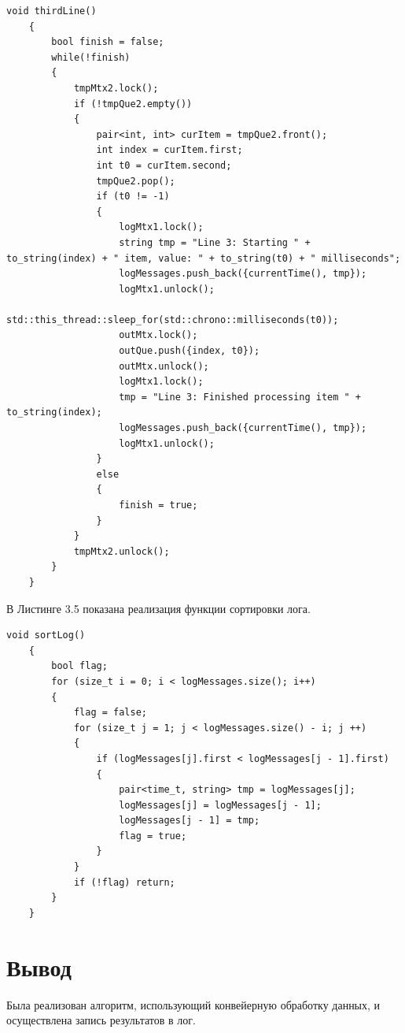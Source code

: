 \documentclass[a4paper,12pt]{report}
\begin{document}
\begin{lstlisting}[caption=Функция третьей линии конвеера]
    void thirdLine()
    {
        bool finish = false;
        while(!finish)
        {
            tmpMtx2.lock();
            if (!tmpQue2.empty())
            {
                pair<int, int> curItem = tmpQue2.front();
                int index = curItem.first;
                int t0 = curItem.second;
                tmpQue2.pop();
                if (t0 != -1)
                {
                    logMtx1.lock();
                    string tmp = "Line 3: Starting " + to_string(index) + " item, value: " + to_string(t0) + " milliseconds";
                    logMessages.push_back({currentTime(), tmp});
                    logMtx1.unlock();
                    std::this_thread::sleep_for(std::chrono::milliseconds(t0));
                    outMtx.lock();
                    outQue.push({index, t0});
                    outMtx.unlock();
                    logMtx1.lock();
                    tmp = "Line 3: Finished processing item " + to_string(index);
                    logMessages.push_back({currentTime(), tmp});
                    logMtx1.unlock();
                }
                else
                {
                    finish = true;
                }
            }
            tmpMtx2.unlock();
        }
    }
\end{lstlisting}

В Листинге 3.5 показана реализация функции сортировки лога.

\begin{lstlisting}[caption=Функция сортировки лога]
    void sortLog()
    {
        bool flag;
        for (size_t i = 0; i < logMessages.size(); i++)
        {
            flag = false;
            for (size_t j = 1; j < logMessages.size() - i; j ++)
            {
                if (logMessages[j].first < logMessages[j - 1].first)
                {
                    pair<time_t, string> tmp = logMessages[j];
                    logMessages[j] = logMessages[j - 1];
                    logMessages[j - 1] = tmp;
                    flag = true;
                }
            }
            if (!flag) return;
        }
    }
\end{lstlisting}

\section{Вывод}
Была реализован алгоритм, использующий конвейерную обработку данных, и осуществлена запись результатов в лог.
\end{document}
